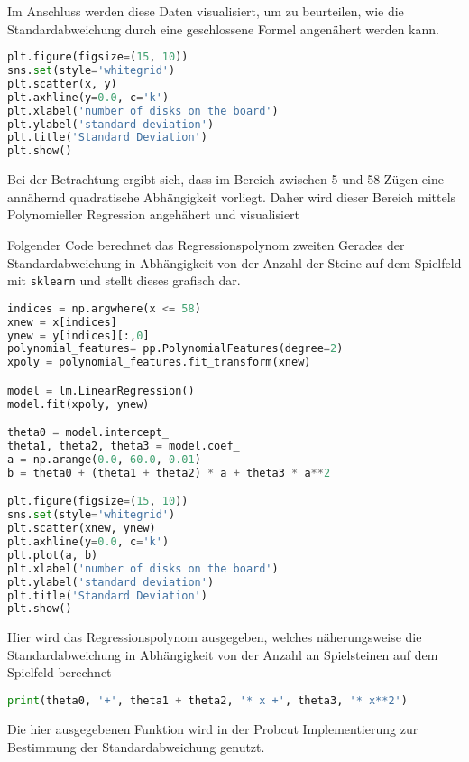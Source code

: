Im Anschluss werden diese Daten visualisiert, um zu beurteilen, wie die
Standardabweichung durch eine geschlossene Formel angenähert werden
kann.

\begin{lstlisting}[language=Python]
plt.figure(figsize=(15, 10))
sns.set(style='whitegrid')
plt.scatter(x, y)
plt.axhline(y=0.0, c='k')
plt.xlabel('number of disks on the board')
plt.ylabel('standard deviation')
plt.title('Standard Deviation')
plt.show()
\end{lstlisting}

Bei der Betrachtung ergibt sich, dass im Bereich zwischen 5 und 58 Zügen
eine annähernd quadratische Abhängigkeit vorliegt. Daher wird dieser
Bereich mittels Polynomieller Regression angehähert und visualisiert

Folgender Code berechnet das Regressionspolynom zweiten Gerades der
Standardabweichung in Abhängigkeit von der Anzahl der Steine auf dem
Spielfeld mit \passthrough{\lstinline!sklearn!} und stellt dieses
grafisch dar.

\begin{lstlisting}[language=Python]
indices = np.argwhere(x <= 58)
xnew = x[indices]
ynew = y[indices][:,0]
polynomial_features= pp.PolynomialFeatures(degree=2)
xpoly = polynomial_features.fit_transform(xnew)

model = lm.LinearRegression()
model.fit(xpoly, ynew)

theta0 = model.intercept_
theta1, theta2, theta3 = model.coef_
a = np.arange(0.0, 60.0, 0.01)
b = theta0 + (theta1 + theta2) * a + theta3 * a**2

plt.figure(figsize=(15, 10))
sns.set(style='whitegrid')
plt.scatter(xnew, ynew)
plt.axhline(y=0.0, c='k')
plt.plot(a, b)
plt.xlabel('number of disks on the board')
plt.ylabel('standard deviation')
plt.title('Standard Deviation')
plt.show()
\end{lstlisting}

Hier wird das Regressionspolynom ausgegeben, welches näherungsweise die
Standardabweichung in Abhängigkeit von der Anzahl an Spielsteinen auf
dem Spielfeld berechnet

\begin{lstlisting}[language=Python]
print(theta0, '+', theta1 + theta2, '* x +', theta3, '* x**2')
\end{lstlisting}

Die hier ausgegebenen Funktion wird in der Probcut Implementierung zur
Bestimmung der Standardabweichung genutzt.
